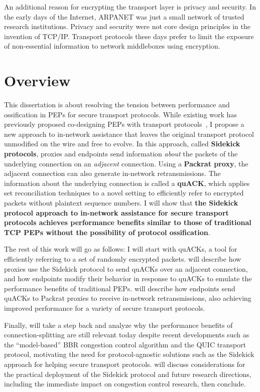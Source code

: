 An additional reason for encrypting the transport layer is privacy and security.
In the early days of the Internet, ARPANET was just a small network of trusted
research institutions. Privacy and security were not core design principles in
the invention of TCP/IP. Transport protocols these days prefer to limit the
exposure of non-essential information to network middleboxes using encryption.

\section{Overview}

This dissertation is about resolving the tension between performance and
ossification in PEPs for secure transport protocols. While existing work has
previously proposed co-designing PEPs with transport protocols~\cite{ford2008logjam,sherry2015blindbox, dogar2012tapa,iyengar2009flow},
I propose a new
approach to in-network assistance that leaves the original transport protocol
unmodified on the wire and free to evolve. In this approach, called \textbf
{Sidekick protocols}, proxies and endpoints send information \textit{about} the
packets of the underlying connection on an \textit{adjacent} connection.
Using a \textbf{Packrat proxy}, the adjacent connection can also generate
in-network retransmissions.
The information about the underlying connection is called a \textbf
{quACK}, which applies set reconciliation techniques to a novel setting to
efficiently refer to encrypted packets without plaintext sequence numbers.
I will show that \textcolor{black!50!blue}{\textbf{the Sidekick protocol
approach to in-network assistance for secure transport protocols achieves
performance benefits similar to those of traditional TCP PEPs without
the possibility of protocol ossification}}.

The rest of this work will go as follows:
I will start  with quACKs, a tool for efficiently
referring to a set of randomly encrypted packets.
 will describe how proxies use the Sidekick protocol to send
quACKs over an adjacent connection, and how endpoints modify their behavior in
response to quACKs to emulate the performance benefits of traditional PEPs.
 will describe how endpoints send quACKs to Packrat
proxies to receive in-network retransmissions, also achieving improved
performance for a variety of secure transport protocols.

Finally,  will take a step back and analyze why the performance
benefits of connection-splitting are still relevant today despite recent
developments such as the ``model-based'' BBR congestion control algorithm and
the QUIC transport protocol, motivating the need for protocol-agnostic solutions
such as the Sidekick approach for helping secure transport protocols.
 will discuss considerations for the practical deployment of
the Sidekick protocol and future research directions, including the immediate
impact on congestion control research, then conclude.

